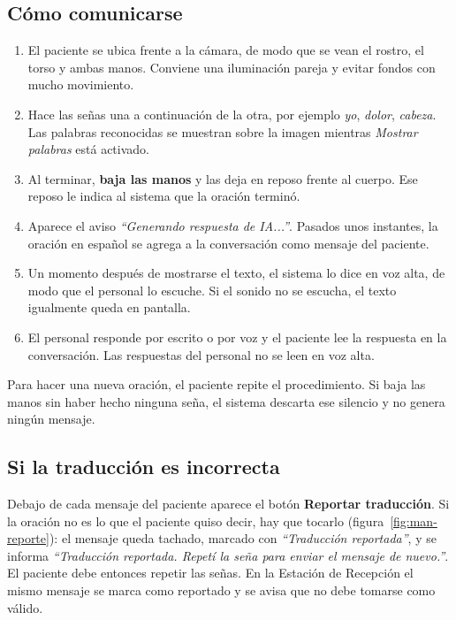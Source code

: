 \subsection{Cómo comunicarse}

\begin{enumerate}
  \item El paciente se ubica frente a la cámara, de modo que se vean el rostro, el torso y ambas manos. Conviene una iluminación pareja y evitar fondos con mucho movimiento.
  \item Hace las señas una a continuación de la otra, por ejemplo \emph{yo}, \emph{dolor}, \emph{cabeza}. Las palabras reconocidas se muestran sobre la imagen mientras \emph{Mostrar palabras} está activado.
  \item Al terminar, \textbf{baja las manos} y las deja en reposo frente al cuerpo. Ese reposo le indica al sistema que la oración terminó.
  \item Aparece el aviso \emph{``Generando respuesta de IA...''}. Pasados unos instantes, la oración en español se agrega a la conversación como mensaje del paciente.
  \item Un momento después de mostrarse el texto, el sistema lo dice en voz alta, de modo que el personal lo escuche. Si el sonido no se escucha, el texto igualmente queda en pantalla.
  \item El personal responde por escrito o por voz y el paciente lee la respuesta en la conversación. Las respuestas del personal no se leen en voz alta.
\end{enumerate}

Para hacer una nueva oración, el paciente repite el procedimiento. Si baja las manos sin haber hecho ninguna seña, el sistema descarta ese silencio y no genera ningún mensaje.

\subsection{Si la traducción es incorrecta}

Debajo de cada mensaje del paciente aparece el botón \textbf{Reportar traducción}. Si la oración no es lo que el paciente quiso decir, hay que tocarlo (figura~\ref{fig:man-reporte}): el mensaje queda tachado, marcado con \emph{``Traducción reportada''}, y se informa \emph{``Traducción reportada. Repetí la seña para enviar el mensaje de nuevo.''}. El paciente debe entonces repetir las señas. En la Estación de Recepción el mismo mensaje se marca como reportado y se avisa que no debe tomarse como válido.

